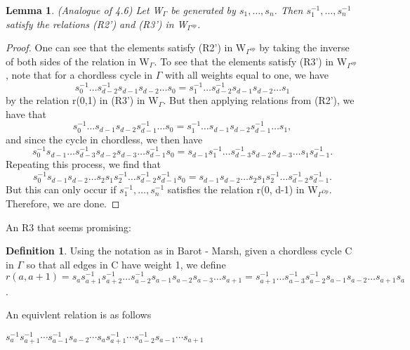 \documentclass[11pt]{amsart}
\newtheorem{lem}[thm]{Lemma}
\theoremstyle{definition}
\newtheorem{defn}[thm]{Definition}
\begin{document}
\begin{lem} (Analogue of 4.6) 
Let W$_{\Gamma}$ be generated by $s_{1}, \dots, s_{n}$. Then $s_{1}^{-1}, \dots, s_{n}^{-1}$ satisfy the relations (R2') and (R3') in W$_{\Gamma^{op}}$.
\end{lem}
\begin{proof}
One can see that the elements satisfy (R2') in W$_{\Gamma^{op}}$ by taking the inverse of both sides of the relation in W$_{\Gamma}$. To see that the elements satisfy (R3') in W$_{\Gamma^{op}}$, note that for a chordless cycle in $\Gamma$ with all weights equal to one, we have $$s_{0}^{-1}\dots s_{d-2}^{-1}s_{d-1}s_{d-2}\dots s_{0} = s_{1}^{-1}\dots s_{d-2}^{-1}s_{d-1}s_{d-2}\dots s_{1}$$ by the relation r(0,1) in (R3') in W$_{\Gamma}$. But then applying relations from (R2'), we have that $$s_{0}^{-1}\dots s_{d-1}s_{d-2}s_{d-1}^{-1}\dots s_{0} = s_{1}^{-1}\dots s_{d-1}s_{d-2}s_{d-1}^{-1}\dots s_{1},$$ and since the cycle in chordless, we then have $$s_{0}^{-1}s_{d-1}\dots s_{d-3}^{-1}s_{d-2}s_{d-3}\dots s_{d-1}^{-1}s_{0} = s_{d-1}s_{1}^{-1}\dots s_{d-3}^{-1}s_{d-2}s_{d-3}\dots s_{1}s_{d-1}^{-1}.$$ Repeating this process, we find that $$s_{0}^{-1}s_{d-1}s_{d-2}\dots s_{2}s_{1}s_{2}^{-1}\dots s_{d-2}^{-1}s_{d-1}^{-1}s_{0} = s_{d-1}s_{d-2}\dots s_{2}s_{1}s_{2}^{-1}\dots s_{d-2}^{-1}s_{d-1}^{-1}.$$ But this can only occur if $s_{1}^{-1}, \dots, s_{n}^{-1}$ satisfies the relation r(0, d-1) in W$_{\Gamma^{Op}}.$ Therefore, we are done.
\end{proof}

An R3 that seems promising:

\begin{defn}
Using the notation as in Barot - Marsh, given a chordless cycle C in $\Gamma$ so that all edges in C have weight 1, we define $r(a, a+1) = s_{a}s_{a+1}^{-1}s_{a+2}^{-1}\dots s_{a-2}^{-1}s_{a-1}s_{a-2}s_{a-3}\dots s_{a+1} = s_{a+1}^{-1}\dots s_{a-3}^{-1}s_{a-2}^{-1}s_{a-1}s_{a-2}\dots s_{a+1}s_{a}$.

An equivlent relation is as follows

$s_a^{-1} s_{a+1}^{-1}\cdots s_{a-1}^{-1}s_{a-2}\cdots s_a s_{a+1}^{-1}\cdots s_{a-2}^{-1} s_{a-1}\cdots s_{a+1}$
\end{defn}
\end{document}
